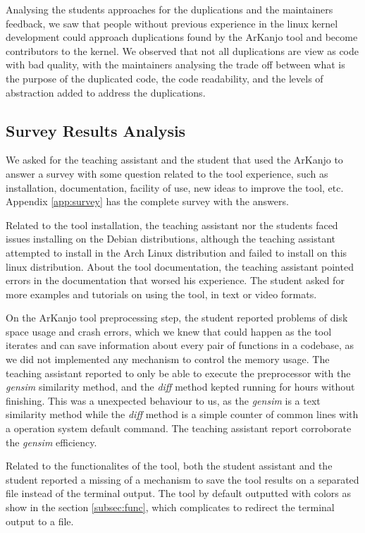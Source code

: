 Analysing the students approaches for the duplications and the maintainers feedback, 
we saw that people without previous experience in the linux kernel development could approach 
duplications found by the ArKanjo tool and become contributors to the kernel. We observed that 
not all duplications are view as code with bad quality, with the maintainers analysing the trade off
between what is the purpose of the duplicated code, the code readability, and the levels of abstraction 
added to address the duplications.

\subsection{Survey Results Analysis}

We asked for the teaching assistant and the student that used the ArKanjo to answer a survey with some 
question related to the tool experience, such as installation, documentation, facility of use, new ideas
to improve the tool, etc. Appendix \ref{app:survey} has the complete survey with the answers.

Related to the tool installation, the teaching assistant nor the students faced issues installing on the
Debian distributions, although the teaching assistant attempted to install in the Arch Linux distribution and
failed to install on this linux distribution.  About the tool documentation, the teaching assistant pointed errors in 
the documentation that worsed his experience. The student asked for more examples 
and tutorials on using the tool, in text or video formats. 

On the ArKanjo tool preprocessing step, the student reported problems of disk space usage and crash errors,
which we knew that could happen as the tool iterates and can save information about every pair of functions in
a codebase, as we did not implemented any mechanism to control the memory usage. The teaching assistant reported 
to only be able to execute the preprocessor with the \textit{gensim} similarity method, and the \textit{diff}
method kepted running for hours without finishing. This was a unexpected behaviour to us, as the \textit{gensim}
is a text similarity method while the \textit{diff} method is a simple counter of common lines with a operation system
default command. The teaching assistant report corroborate the \textit{gensim} efficiency.

Related to the functionalites of the tool, both the student assistant and the student 
reported a missing of a mechanism to save the tool results on a separated file instead of the terminal output.
The tool by default outputted with colors as show in the section \ref{subsec:func}, which complicates to redirect
the terminal output to a file.

